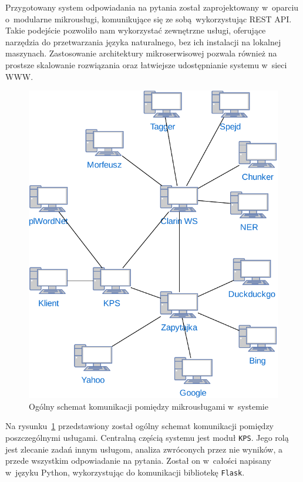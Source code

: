 Przygotowany system odpowiadania na pytania został zaprojektowany w~oparciu o~modularne mikrousługi, komunikujące się ze sobą wykorzystując REST API. Takie podejście pozwoliło nam wykorzystać zewnętrzne usługi, oferujące narzędzia do przetwarzania języka naturalnego, bez ich instalacji na lokalnej maszynach. Zastosowanie architektury mikroserwisowej pozwala również na prostsze skalowanie rozwiązania oraz łatwiejsze udostępnianie systemu w~sieci WWW.

\begin{figure}[h]
    \centering
    \includegraphics[width=\columnwidth]{figures/WEDT-Uslugi.pdf}
    \caption{Ogólny schemat komunikacji pomiędzy mikrousługami w~systemie}
    \label{fig:microservices}
\end{figure}

Na rysunku~\ref{fig:microservices} przedstawiony został ogólny schemat komunikacji pomiędzy poszczególnymi usługami. Centralną częścią systemu jest moduł \texttt{KPS}. Jego rolą jest zlecanie zadań innym usługom, analiza zwróconych przez nie wyników, a przede wszystkim odpowiadanie na pytania. Został on w~całości napisany w~języku Python, wykorzystując do komunikacji bibliotekę \texttt{Flask}.

